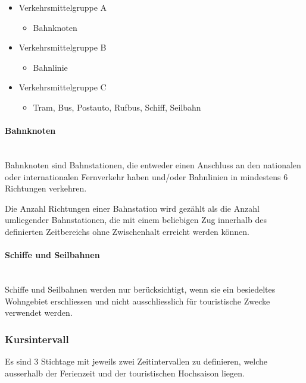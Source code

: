 \begin{itemize}[noitemsep]
    \item Verkehrsmittelgruppe A
    \begin{itemize}
        \item Bahnknoten
    \end{itemize}
    \item Verkehrsmittelgruppe B
    \begin{itemize}
        \item Bahnlinie
    \end{itemize}
    \item Verkehrsmittelgruppe C
    \begin{itemize}
        \item Tram, Bus, Postauto, Rufbus, Schiff, Seilbahn
    \end{itemize}
\end{itemize}

\paragraph{Bahnknoten}~\\
Bahnknoten sind Bahnstationen, die entweder einen Anschluss an den nationalen oder internationalen Fernverkehr haben und/oder Bahnlinien in mindestens 6 Richtungen verkehren.

Die Anzahl Richtungen einer Bahnstation wird gezählt als die Anzahl umliegender Bahnstationen, die mit einem beliebigen Zug innerhalb des definierten Zeitbereichs ohne Zwischenhalt erreicht werden können.

\paragraph{Schiffe und Seilbahnen}~\\
Schiffe und Seilbahnen werden nur berücksichtigt, wenn sie ein besiedeltes Wohngebiet erschliessen und nicht ausschliesslich für touristische Zwecke verwendet werden.


\subsubsection{Kursintervall}
\label{Berechnungsmethodik OeVGK18:Kursintervall}
Es sind 3 Stichtage mit jeweils zwei Zeitintervallen zu definieren, welche ausserhalb der Ferienzeit und der touristischen Hochsaison liegen.

